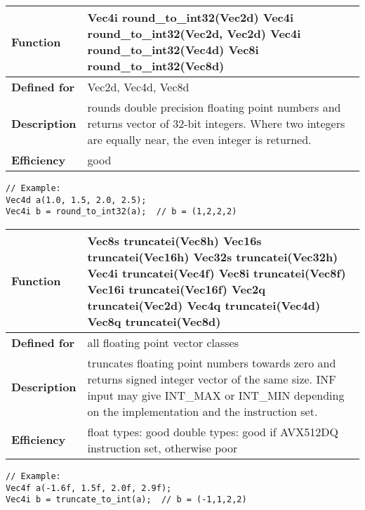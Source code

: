 \documentclass[vcl_manual.tex]{subfiles}
\begin{document}
\begin{tabular}{|p{30mm}|p{120mm}|}
\hline
\bfseries Function & 
Vec4i round\_to\_int32(Vec2d) \newline
Vec4i round\_to\_int32(Vec2d, Vec2d) \newline
Vec4i round\_to\_int32(Vec4d) \newline
Vec8i round\_to\_int32(Vec8d)\\ \hline
\bfseries Defined for & Vec2d, Vec4d, Vec8d \\ \hline
\bfseries Description & rounds double precision floating point numbers and returns vector of 32-bit integers. Where two integers are equally near, the even integer is returned. 
\\ \hline
\bfseries Efficiency & good \\ \hline
\end{tabular}
\begin{lstlisting}[frame=none]
// Example:
Vec4d a(1.0, 1.5, 2.0, 2.5);
Vec4i b = round_to_int32(a);  // b = (1,2,2,2)
\end{lstlisting}

\label{truncateToInt}
\begin{tabular}{|p{30mm}|p{120mm}|}
\hline
\bfseries Function & 
Vec8s truncatei(Vec8h) \newline
Vec16s truncatei(Vec16h) \newline
Vec32s truncatei(Vec32h) \newline
Vec4i truncatei(Vec4f) \newline
Vec8i truncatei(Vec8f)\newline
Vec16i truncatei(Vec16f)\newline
Vec2q truncatei(Vec2d) \newline
Vec4q truncatei(Vec4d) \newline
Vec8q truncatei(Vec8d) \\ \hline
\bfseries Defined for & all floating point vector classes \\ \hline
\bfseries Description & truncates floating point numbers towards zero and returns signed integer vector of the same size.  \newline
INF input may give INT\_MAX or INT\_MIN depending on the implementation and the instruction set.\\ \hline
\bfseries Efficiency & 
float types: good \newline
double types: good if AVX512DQ instruction set, otherwise poor  \\ \hline
\end{tabular}
\begin{lstlisting}[frame=none]
// Example:
Vec4f a(-1.6f, 1.5f, 2.0f, 2.9f);
Vec4i b = truncate_to_int(a);  // b = (-1,1,2,2)
\end{lstlisting}
\end{document}
